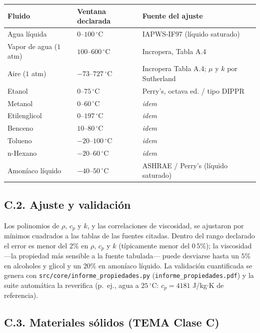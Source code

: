 \documentclass[11pt,a4paper]{article}
\begin{document}
\begin{center}
{\small
\begin{tabular}{@{}lll@{}}
\toprule
\textbf{Fluido} & \textbf{Ventana declarada} & \textbf{Fuente del ajuste} \\
\midrule
Agua l\'iquida & $0$--$100\,^{\circ}$C & IAPWS-IF97 (l\'iquido saturado) \\
Vapor de agua ($1$ atm) & $100$--$600\,^{\circ}$C & Incropera, Tabla A.4 \\
Aire ($1$ atm) & $-73$--$727\,^{\circ}$C & Incropera Tabla A.4; $\mu$ y $k$ por Sutherland \\
Etanol & $0$--$75\,^{\circ}$C & Perry's, octava ed. / tipo DIPPR \\
Metanol & $0$--$60\,^{\circ}$C & \textit{idem} \\
Etilenglicol & $0$--$197\,^{\circ}$C & \textit{idem} \\
Benceno & $10$--$80\,^{\circ}$C & \textit{idem} \\
Tolueno & $-20$--$100\,^{\circ}$C & \textit{idem} \\
n-Hexano & $-20$--$60\,^{\circ}$C & \textit{idem} \\
Amon\'iaco l\'iquido & $-40$--$50\,^{\circ}$C & ASHRAE / Perry's (l\'iquido saturado) \\
\bottomrule
\end{tabular}}
\end{center}

\subsection*{C.2. Ajuste y validaci\'on}

Los polinomios de $\rho$, $c_p$ y $k$, y las correlaciones de viscosidad,
se ajustaron por m\'inimos cuadrados a las tablas de las fuentes citadas.
Dentro del rango declarado el error es menor del $2\%$ en $\rho$, $c_p$ y
$k$ (t\'ipicamente menor del $0\,5\%$); la viscosidad ---la propiedad m\'as
sensible a la fuente tabulada--- puede desviarse hasta un $5\%$ en
alcoholes y glicol y un $20\%$ en amon\'iaco l\'iquido. La validaci\'on
cuantificada se genera con \texttt{src/core/informe\_propiedades.py}
(\texttt{informe\_propiedades.pdf}) y la suite autom\'atica la reverifica
(p.~ej., agua a $25\,^{\circ}$C: $c_p = 4181$ J/kg$\cdot$K de referencia).

\subsection*{C.3. Materiales s\'olidos (TEMA Clase C)}
\end{document}
